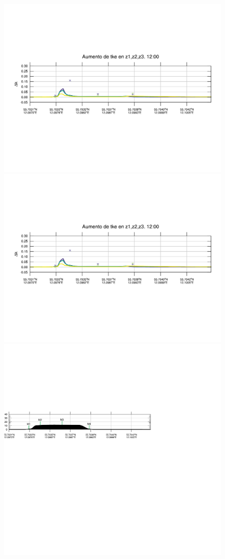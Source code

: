 \begin{figure}[H]
	\includegraphics[width=0.90\linewidth,trim={12mm 84mm 10mm 74mm},page=25,clip]{Imagenes/06/bol/delta_tke}\\%
	\includegraphics[width=0.90\linewidth,trim={12mm 84mm 10mm 74mm},page=37,clip]{Imagenes/06/bol/delta_tke}\\%
	\includegraphics[width=0.90\linewidth,trim={-13.3mm 193mm 115mm 112mm},clip]{Imagenes/06/bol/cross_height}\\%

\end{figure}
